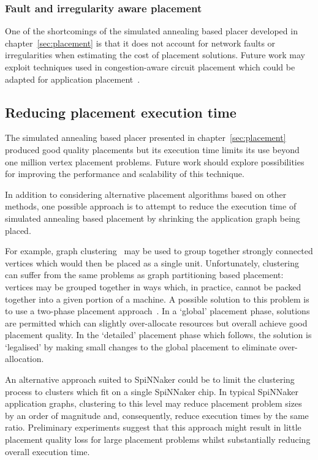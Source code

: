 			\subsubsection{Fault and irregularity aware placement}
				
				One of the shortcomings of the simulated annealing based placer
				developed in chapter~\ref{sec:placement} is that it does not account
				for network faults or irregularities when estimating the cost of
				placement solutions.  Future work may exploit techniques used in
				congestion-aware circuit placement which could be adapted for
				application placement~\cite{viswanathan07}.
		
		\subsection{Reducing placement execution time}
			
			The simulated annealing based placer presented in
			chapter~\ref{sec:placement} produced good quality placements but its
			execution time limits its use beyond one million vertex placement
			problems. Future work should explore possibilities for improving the
			performance and scalability of this technique.
			
			In addition to considering alternative placement algorithms based on
			other methods, one possible approach is to attempt to reduce the execution
			time of simulated annealing based placement by shrinking the application
			graph being placed.
			
			For example, graph clustering~\cite{schaeffer07} may be used to group
			together strongly connected vertices which would then be placed as a
			single unit.  Unfortunately, clustering can suffer from the same problems
			as graph partitioning based placement: vertices may be grouped together
			in ways which, in practice, cannot be packed together into a given portion
			of a machine.  A possible solution to this problem is to use a two-phase
			placement approach~\cite{kahng11}. In a `global' placement phase,
			solutions are permitted which can slightly over-allocate resources but
			overall achieve good placement quality. In the `detailed' placement phase
			which follows, the solution is `legalised' by making small changes to the
			global placement to eliminate over-allocation.
			
			An alternative approach suited to SpiNNaker could be to limit the
			clustering process to clusters which fit on a single SpiNNaker chip. In
			typical SpiNNaker application graphs, clustering to this level may reduce
			placement problem sizes by an order of magnitude and, consequently,
			reduce execution times by the same ratio. Preliminary experiments suggest
			that this approach might result in little placement quality loss for
			large placement problems whilst substantially reducing overall execution
			time.
		
